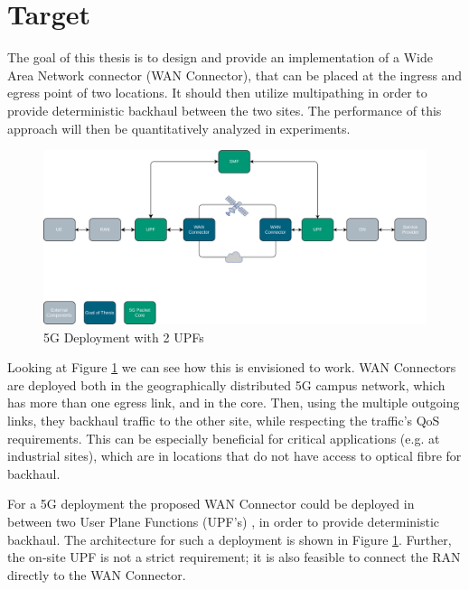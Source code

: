 
\section{Target}
\label{sec:target}

The goal of this thesis is to design and provide an implementation of a Wide Area Network connector (WAN Connector), that can be placed at the ingress and egress point of two locations. It should then utilize multipathing in order to provide deterministic backhaul between the two sites. The performance of this approach will then be quantitatively analyzed in experiments.

\begin{figure}[h]
    \centering
        \includegraphics[width=\textwidth]{fig/telco-use-case-2.png}
        \caption{5G Deployment with 2 UPFs}
        \label{fig:telco}
\end{figure}

Looking at Figure \ref{fig:telco} we can see how this is envisioned to work. WAN Connectors are deployed both in the geographically distributed 5G campus network, which has more than one egress link, and in the core. Then, using the multiple outgoing links, they backhaul traffic to the other site, while respecting the traffic's QoS requirements. This can be especially beneficial for critical applications (e.g. at industrial sites), which are in locations that do not have access to optical fibre for backhaul.

For a 5G deployment the proposed WAN Connector could be deployed in between two User Plane Functions (UPF's) , in order to provide deterministic backhaul. The architecture for such a deployment is shown in Figure \ref{fig:telco}. Further, the on-site UPF is not a strict requirement; it is also feasible to connect the RAN directly to the WAN Connector.



